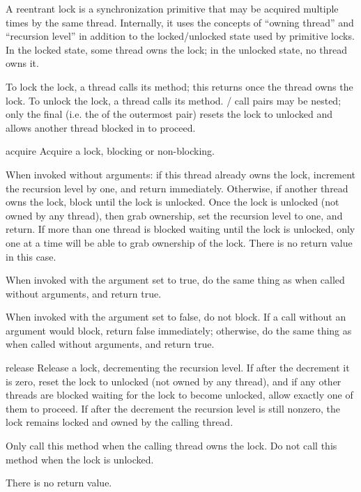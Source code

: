 A reentrant lock is a synchronization primitive that may be
acquired multiple times by the same thread.  Internally, it uses
the concepts of ``owning thread'' and ``recursion level'' in
addition to the locked/unlocked state used by primitive locks.  In
the locked state, some thread owns the lock; in the unlocked
state, no thread owns it.

To lock the lock, a thread calls its  method; this
returns once the thread owns the lock.  To unlock the lock, a
thread calls its  method.  / call pairs
may be nested; only the final  (i.e. the  of the
outermost pair) resets the lock to unlocked and allows another
thread blocked in  to proceed.

\begin{methoddesc}{acquire}{}
Acquire a lock, blocking or non-blocking.

When invoked without arguments: if this thread already owns
the lock, increment the recursion level by one, and return
immediately.  Otherwise, if another thread owns the lock,
block until the lock is unlocked.  Once the lock is unlocked
(not owned by any thread), then grab ownership, set the
recursion level to one, and return.  If more than one thread
is blocked waiting until the lock is unlocked, only one at a
time will be able to grab ownership of the lock.  There is no
return value in this case.

When invoked with the  argument set to true, do the
same thing as when called without arguments, and return true.

When invoked with the  argument set to false, do not
block.  If a call without an argument would block, return false
immediately; otherwise, do the same thing as when called
without arguments, and return true.
\end{methoddesc}

\begin{methoddesc}{release}{}
Release a lock, decrementing the recursion level.  If after the
decrement it is zero, reset the lock to unlocked (not owned by any
thread), and if any other threads are blocked waiting for the lock to
become unlocked, allow exactly one of them to proceed.  If after the
decrement the recursion level is still nonzero, the lock remains
locked and owned by the calling thread.

Only call this method when the calling thread owns the lock.
Do not call this method when the lock is unlocked.

There is no return value.
\end{methoddesc}



